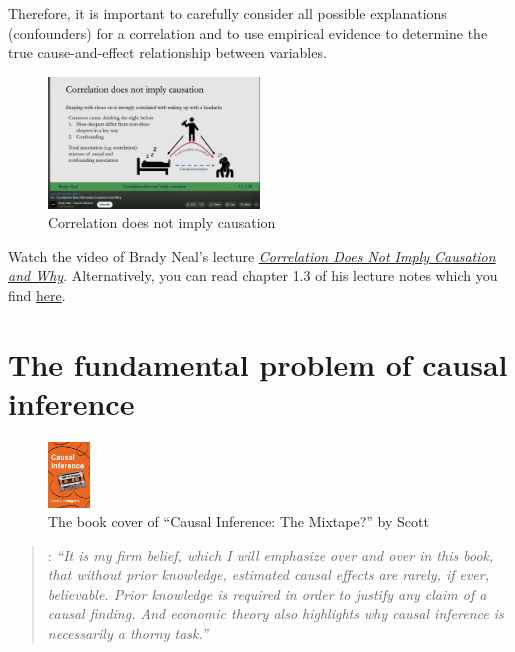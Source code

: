 \documentclass[
  12pt,
  oneside]{book}
\theoremstyle{definition}
\theoremstyle{definition}
\theoremstyle{definition}
\theoremstyle{definition}
\theoremstyle{remark}
\begin{document}
Therefore, it is important to carefully consider all possible explanations (confounders) for a correlation and to use empirical evidence to determine the true cause-and-effect relationship between variables.

\begin{figure}
\centering
\includegraphics[width=0.5\textwidth,height=\textheight]{fig/neal1-3.png}
\caption[\label{fig:cdnic} Correlation does not imply causation]{\label{fig:cdnic} Correlation does not imply causation\footnotemark{}}
\end{figure}

Watch the video of Brady Neal's lecture \href{https://youtu.be/DFPm_a-_uJM}{\emph{Correlation Does Not Imply Causation and Why}}. Alternatively, you can read chapter 1.3 of his lecture notes \citep{Neal2020Introduction} which you find \href{https://www.bradyneal.com/Introduction_to_Causal_Inference-Dec17_2020-Neal.pdf}{here}.

\hypertarget{the-fundamental-problem-of-causal-inference}{%
\section{The fundamental problem of causal inference}\label{the-fundamental-problem-of-causal-inference}}

\begin{figure}
\centering
\includegraphics[width=0.1\textwidth,height=\textheight]{fig/cover-ci.jpg}
\caption{\label{fig:cunbook} The book cover of ``Causal Inference: The Mixtape?'' by Scott \citet{Cunningham2021Causal}}
\end{figure}

\begin{quote}
\citet[ch.~1.3]{Cunningham2021Causal}: \emph{``It is my firm belief, which I will emphasize over and over in this book, that without prior knowledge, estimated causal effects are rarely, if ever, believable. Prior knowledge is required in order to justify any claim of a causal finding. And economic theory also highlights why causal inference is necessarily a thorny task.''}
\end{quote}
\end{document}
